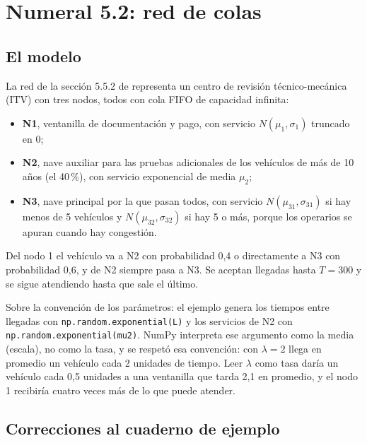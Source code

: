 \documentclass[11pt,letterpaper]{article}
\begin{document}
\section{Numeral 5.2: red de colas}

\subsection{El modelo}

La red de la sección 5.5.2 de \cite{rios08} representa un centro de revisión técnico-mecánica (ITV) con tres
nodos, todos con cola FIFO de capacidad infinita:

\begin{itemize}[itemsep=1pt]
\item \textbf{N1}, ventanilla de documentación y pago, con servicio $N(\mu_1, \sigma_1)$ truncado en 0;
\item \textbf{N2}, nave auxiliar para las pruebas adicionales de los vehículos de más de 10 años (el 40\,\%),
con servicio exponencial de media $\mu_2$;
\item \textbf{N3}, nave principal por la que pasan todos, con servicio $N(\mu_{31}, \sigma_{31})$ si hay menos de 5
vehículos y $N(\mu_{32}, \sigma_{32})$ si hay 5 o más, porque los operarios se apuran cuando hay congestión.
\end{itemize}

Del nodo 1 el vehículo va a N2 con probabilidad 0,4 o directamente a N3 con probabilidad 0,6, y de N2 siempre
pasa a N3. Se aceptan llegadas hasta $T = 300$ y se sigue atendiendo hasta que sale el último.

Sobre la convención de los parámetros: el ejemplo genera los tiempos entre llegadas con
\texttt{np.random.exponential(L)} y los servicios de N2 con \texttt{np.random.exponential(mu2)}. NumPy
interpreta ese argumento como la media (escala), no como la tasa, y se respetó esa convención: con
$\lambda = 2$ llega en promedio un vehículo cada 2 unidades de tiempo. Leer $\lambda$ como tasa daría un
vehículo cada 0,5 unidades a una ventanilla que tarda 2,1 en promedio, y el nodo 1 recibiría cuatro veces más
de lo que puede atender.

\subsection{Correcciones al cuaderno de ejemplo}
\end{document}
